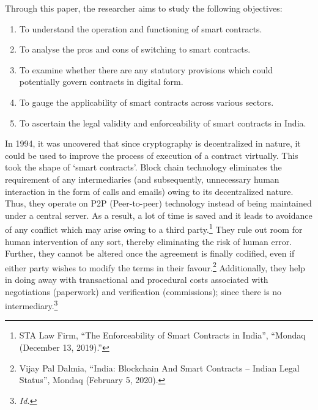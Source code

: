 \begin{multicols}{2}
\noi
Through this paper, the researcher aims to study the following objectives:

\vspace{-.3cm}

\begin{enumerate}[label=$\bullet$]
\itemsep=0pt
\item To understand the operation and functioning of smart contracts.
\item To analyse the pros and cons of switching to smart contracts.
\item To examine whether there are any statutory provisions which could potentially govern contracts in digital form.
\item To gauge the applicability of smart contracts across various sectors. 
\item To ascertain the legal validity and enforceability of smart contracts in India.
\vspace{-.2cm}
\end{enumerate}


\vspace{-.2cm}


\noi
In 1994, it was uncovered that since cryptography is decentralized in nature, it could be used
to improve the process of execution of a contract virtually. This took the shape of ‘smart
contracts’. Block chain technology eliminates the requirement of any intermediaries (and
subsequently, unnecessary human interaction in the form of calls and emails) owing to its
decentralized nature. Thus, they operate on P2P (Peer-to-peer) technology instead of being
maintained under a central server. As a result, a lot of time is saved and it leads to avoidance
of any conflict which may arise owing to a third party.\footnote{STA Law Firm, “The Enforceability of Smart Contracts in India”, “Mondaq (December 13, 2019).”}
 They rule out room for human
intervention of any sort, thereby eliminating the risk of human error. Further, they cannot be
altered once the agreement is finally codified, even if either party wishes to modify the terms
in their favour.\footnote{Vijay Pal Dalmia, “India: Blockchain And Smart Contracts – Indian Legal Status”, Mondaq (February 5, 2020).}
 Additionally, they help in doing away with transactional and procedural costs
associated with negotiations (paperwork) and verification (commissions); since there is no
intermediary.\footnote{\textit{Id.}}


\end{multicols}
